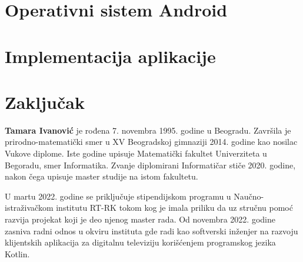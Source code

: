 \documentclass[12pt,oneside]{memoir}
\begin{document}
\chapter{Operativni sistem Android}
\label{sec:android}


\chapter{Implementacija aplikacije}
\label{sec:implementacija}


\chapter{Zaključak}


\literatura

\backmatter

\begin{biografija}
  \textbf{Tamara Ivanović} je rođena 7. novembra 1995. godine u Beogradu. Završila je prirodno-matematički smer u XV Beogradskoj gimnaziji 2014. godine kao nosilac Vukove diplome. Iste godine upisuje Matematički fakultet Univerziteta u Begoradu, smer Informatika. Zvanje diplomirani Informatičar stiče 2020. godine, nakon čega upisuje master studije na istom fakultetu. 
  
  U martu 2022. godine se priključuje stipendijskom programu u Naučno-istraživač\-kom institutu RT-RK tokom kog je imala priliku da uz stručnu pomoć razvija projekat koji je deo njenog master rada. Od novembra 2022. godine zasniva radni odnos u okviru instituta gde radi kao softverski inženjer na razvoju klijentskih aplikacija za digitalnu televiziju korišćenjem programskog jezika Kotlin. 
\end{biografija}
\end{document}
